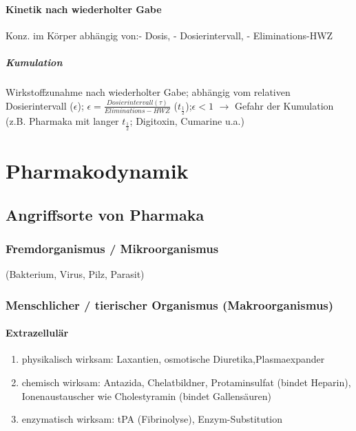\documentclass[10pt,a4paper]{report}
\begin{document}
\subsubsection{Kinetik nach wiederholter Gabe}
Konz. im Körper abhängig von:- Dosis, - Dosierintervall, - Eliminations-HWZ \\
\paragraph{Kumulation}  Wirkstoffzunahme nach wiederholter Gabe; abhängig vom relativen Dosierintervall ($\epsilon$); $\epsilon=\frac{Dosierintervall(\tau)}{Eliminations-HWZ}$ ($t_{\frac{1}{2}}$);$\epsilon <1$ $\rightarrow$  Gefahr der Kumulation (z.B. Pharmaka mit langer $t_{\frac{1}{2}}$; Digitoxin, Cumarine u.a.) 


\chapter{Pharmakodynamik}
\section{Angriffsorte von Pharmaka}
\subsection{Fremdorganismus / Mikroorganismus}
(Bakterium, Virus, Pilz, Parasit)
\subsection{Menschlicher / tierischer Organismus (Makroorganismus)}
\subsubsection{Extrazellulär}
\begin{enumerate}
	\item physikalisch wirksam: Laxantien, osmotische 	Diuretika,Plasmaexpander
	\item chemisch wirksam: Antazida, Chelatbildner, Protaminsulfat (bindet Heparin), Ionenaustauscher wie Cholestyramin (bindet Gallensäuren)
	\item enzymatisch wirksam: tPA (Fibrinolyse), Enzym-Substitution
\end{enumerate}
\end{document}
